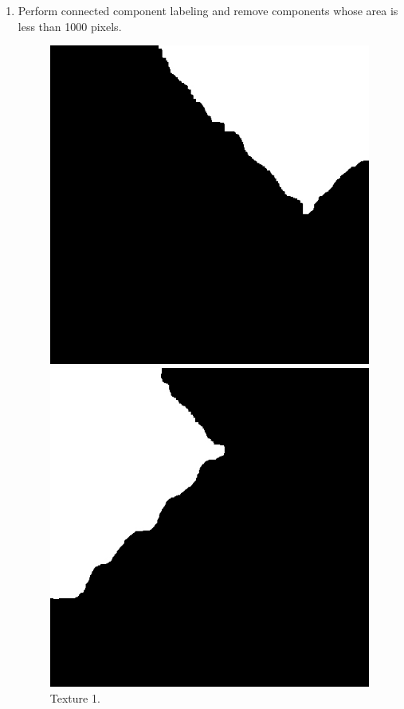 \documentclass[12pt,a4paper,notitlepage,oneside,amsmath,amssymb]{article}
\begin{document}
\begin{CJK*}{UTF8}{bkai}
\begin{enumerate}[label=(\alph*)]
\begin{enumerate}
	\item Perform connected component labeling and remove components whose area is less than 1000 pixels.

	\begin{figure}[hbt!]
		\centering
		\begin{minipage}{.25\textwidth}
			\centering
			\includegraphics[width=.9\linewidth]{sample2_texture1}
			\caption*{Texture 1.}
		\end{minipage}%
		\begin{minipage}{.25\textwidth}
			\centering
			\includegraphics[width=.9\linewidth]{sample2_texture2}

\end{minipage}
\end{figure}
\end{enumerate}
\end{enumerate}
\end{CJK*}
\end{document}

